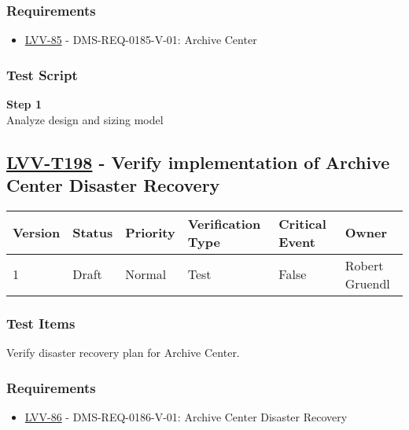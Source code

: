 \subsubsection{Requirements}\label{requirements-56}

\begin{itemize}
\tightlist
\item
  \href{https://jira.lsstcorp.org/browse/LVV-85}{LVV-85} -
  DMS-REQ-0185-V-01: Archive Center
\end{itemize}

\subsubsection{Test Script}\label{test-script-56}

\textbf{Step 1}\\
Analyze design and sizing model\\[2\baselineskip]

\subsection{\texorpdfstring{\href{https://jira.lsstcorp.org/secure/Tests.jspa\#/testCase/LVV-T198}{LVV-T198}
- Verify implementation of Archive Center Disaster
Recovery}{LVV-T198 - Verify implementation of Archive Center Disaster Recovery}}\label{lvv-t198---verify-implementation-of-archive-center-disaster-recovery}

\begin{longtable}[]{@{}llllll@{}}
\toprule
Version & Status & Priority & Verification Type & Critical Event &
Owner\tabularnewline
\midrule
\endhead
1 & Draft & Normal & Test & False & Robert Gruendl\tabularnewline
\bottomrule
\end{longtable}

\subsubsection{Test Items}\label{test-items-57}

Verify disaster recovery plan for Archive Center.

\subsubsection{Requirements}\label{requirements-57}

\begin{itemize}
\tightlist
\item
  \href{https://jira.lsstcorp.org/browse/LVV-86}{LVV-86} -
  DMS-REQ-0186-V-01: Archive Center Disaster Recovery
\end{itemize}

